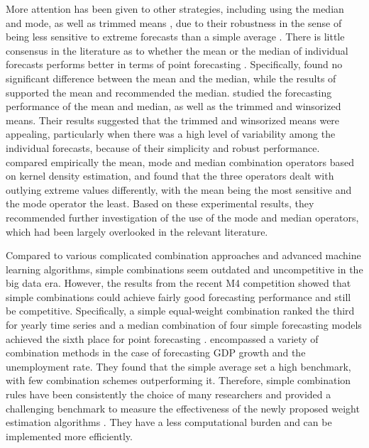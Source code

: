 \documentclass[11pt]{article}
\begin{document}
More attention has been given to other strategies, including using the median and mode, as well as trimmed means \citep[e.g.,][]{Chan1999-io,Stock2004-rq,Genre2013-ut,Jose2014-uh,Grushka-Cockayne2017-dj}, due to their robustness in the sense of being less sensitive to extreme forecasts than a simple average \citep{Lichtendahl2020-ut}. There is little consensus in the literature as to whether the mean or the median of individual forecasts performs better in terms of point forecasting \citep{Kolassa2011-ai}. Specifically, \cite{McNees1992-qc} found no significant difference between the mean and the median, while the results of \cite{Stock2004-rq} supported the mean and \cite{Agnew1985-dj} recommended the median. \cite{Jose2008-vm} studied the forecasting performance of the mean and median, as well as the trimmed and winsorized means. Their results suggested that the trimmed and winsorized means were appealing, particularly when there was a high level of variability among the individual forecasts, because of their simplicity and robust performance. \cite{Kourentzes2014-hs} compared empirically the mean, mode and median combination operators based on kernel density estimation, and found that the three operators dealt with outlying extreme values differently, with the mean being the most sensitive and the mode operator the least. Based on these experimental results, they recommended further investigation of the use of the mode and median operators, which had been largely overlooked in the relevant literature.

Compared to various complicated combination approaches and advanced machine learning algorithms, simple combinations seem outdated and uncompetitive in the big data era. However, the results from the recent M4 competition \citep{Makridakis2020-hu} showed that simple combinations could achieve fairly good forecasting performance and still be competitive. Specifically, a simple equal-weight combination ranked the third for yearly time series \citep{Shaub2019-on} and a median combination of four simple forecasting models achieved the sixth place for point forecasting \citep{Petropoulos2020-fp}. \cite{Genre2013-ut} encompassed a variety of combination methods in the case of forecasting GDP growth and the unemployment rate. They found that the simple average set a high benchmark, with few combination schemes outperforming it. Therefore, simple combination rules have been consistently the choice of many researchers and provided a challenging benchmark to measure the effectiveness of the newly proposed weight estimation algorithms \citep[e.g.,][]{Makridakis2000-he,Stock2004-rq,Makridakis2020-hu,Montero-Manso2020-tq,Kang2020-rl,Wang2021-un}. They have a less computational burden and can be implemented more efficiently.
\end{document}
